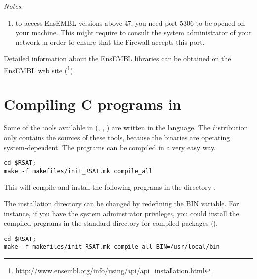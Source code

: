 \documentclass[12pt,a4paper, oneside]{scrreprt} %
\begin{document}
\emph{Notes}: 
\begin{enumerate}
\item to access EnsEMBL versions above 47, you need port 5306 to be
  opened on your machine. This might require to consult the system
  administrator of your network in order to ensure that the Firewall
  accepts this port.
\end{enumerate}

Detailed information about the EnsEMBL libraries can be obtained on
the EnsEMBL web site
(\footnote{\url{http://www.ensembl.org/info/using/api/api\_installation.html}}).



\chapter{Compiling C programs in \RSAT}

Some of the tools available in \RSAT (,
, ) are written in the
 language. The distribution only contains the sources of
these tools, because the binaries are operating system-dependent. The
programs can be compiled in a very easy way.

\begin{lstlisting}
cd $RSAT;
make -f makefiles/init_RSAT.mk compile_all
\end{lstlisting}

This will compile and install the following programs in the directory
. 

The installation directory can be changed by redefining the BIN
variable. For instance, if you have the system adminstrator
privileges, you could install the compiled programs in the standard
directory for compiled packages ().

\begin{lstlisting}
cd $RSAT;
make -f makefiles/init_RSAT.mk compile_all BIN=/usr/local/bin
\end{lstlisting}
\end{document}
